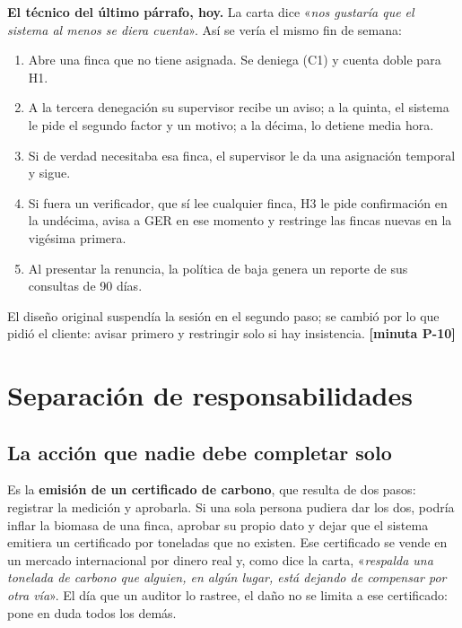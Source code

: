 \documentclass[11pt,letterpaper]{article}
\newcommand{\resp}[1]{\textrm{\footnotesize\bfseries [minuta #1]}}
\newcommand{\carta}[1]{«\emph{#1}»}
\begin{document}
\begin{decision}
\textbf{El técnico del último párrafo, hoy.} La carta dice \carta{nos gustaría que el sistema al menos se
diera cuenta}. Así se vería el mismo fin de semana:
\begin{enumerate}[itemsep=1pt]
\item Abre una finca que no tiene asignada. Se deniega (C1) y cuenta doble para H1.
\item A la tercera denegación su supervisor recibe un aviso; a la quinta, el sistema le pide el
      segundo factor y un motivo; a la décima, lo detiene media hora.
\item Si de verdad necesitaba esa finca, el supervisor le da una asignación temporal y sigue.
\item Si fuera un verificador, que sí lee cualquier finca, H3 le pide confirmación en la undécima,
      avisa a GER en ese momento y restringe las fincas nuevas en la vigésima primera.
\item Al presentar la renuncia, la política de baja genera un reporte de sus consultas de 90 días.
\end{enumerate}
El diseño original suspendía la sesión en el segundo paso; se cambió por lo que pidió el cliente:
avisar primero y restringir solo si hay insistencia. \resp{P-10}
\end{decision}

\section{Separación de responsabilidades}
\label{sec:sod}

\subsection{La acción que nadie debe completar solo}
\label{sec:critica}

Es la \textbf{emisión de un certificado de carbono}, que resulta de dos pasos: registrar la medición y
aprobarla. Si una sola persona pudiera dar los dos, podría inflar la biomasa de una finca, aprobar su
propio dato y dejar que el sistema emitiera un certificado por toneladas que no existen. Ese certificado
se vende en un mercado internacional por dinero real y, como dice la carta, \carta{respalda una tonelada
de carbono que alguien, en algún lugar, está dejando de compensar por otra vía}. El día que un auditor
lo rastree, el daño no se limita a ese certificado: pone en duda todos los demás.
\end{document}
